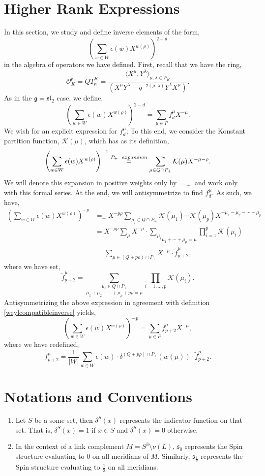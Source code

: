 \documentclass{article}
\def\be{\begin{equation}}
\def\ee{\end{equation}}
\numberwithin{corollary}{theorem}
\numberwithin{corollary}{proposition}
\begin{document}
\section{Higher Rank Expressions}
In this section, we study and define inverse elements of the form,
$$\left(\sum_{w\in W}\epsilon(w)X^{w(\rho)} \right)^{2-d}$$
in the algebra of operators we have defined. First, recall that we have the ring, 
$$\mathcal{O}^\mathfrak{g}_{K} = QT^{K}_\mathfrak{g} = \frac{\langle X^\mu ,Y^\lambda\rangle_{\mu,\lambda\in P_K}}{(X^\mu Y^\lambda - q^{-2(\mu,\lambda)} Y^\lambda X^\mu)}.$$
As in the $\mathfrak{g} = \mathfrak{sl}_2$ case, we define, 
\be\label{high_rank_f}
\left(\sum_{w\in W}\epsilon(w)X^{w(\rho)} \right)^{2-d}=\sum_{\mu\in P} f^\mu_d X^{-\mu}.
\ee
We wish for an explicit expression for $f^\mu_d$; To this end, we consider the Konstant partition function, $\mathcal{K}(\mu)$, which has as its definition,
$$\left(\sum_{w\in W}\epsilon(w)X^{w(\rho)} \right)^{-1} \overset{P_+ \hspace{2mm }expansion}{=} \sum_{\mu\in Q\cap P_+} \mathcal{K}(\mu) X^{-\mu-\rho}.$$
We will denote this expansion in positive weights only by $=_+$ and work only with this formal series. At the end, we will antisymmetrize to find $f^\mu_d$. As such, we have, 
\begin{align*}
\left(\sum_{w\in W}\epsilon(w)X^{w(\rho)} \right)^{-p} & =_+X^{-p \rho}\sum_{\mu_i \in Q \cap P_+} \mathcal{K}(\mu_1)\cdots\mathcal{K}(\mu_p) X^{-\mu_1-\mu_2-\cdots-\mu_p}  \\
& = X^{-\rho p}\sum_\mu X^{-\mu}\cdot \underset{\mu_1+\cdots+\mu_p =\mu}{\sum_{\mu_i}}\prod^p_{i=1}\mathcal{K}(\mu_i)\\
&=\sum_{\mu \in (Q+p\rho)\cap P_+}X^{-\mu} \cdot \tilde{f}^\mu_{p+2},
\end{align*}
where we have set, 
$$\tilde{f}^\mu_{p+2} = \underset{\mu_1+\mu_2+\cdots+\mu_p+p \rho=\mu }{\sum_{\mu_i \in Q\cap P_+}} \prod_{i=1,\ldots,p}\mathcal{K}(\mu_i).$$
Antisymmetrizing the above expression in agreement with definition \ref{weylcompatibleinverse}  yields,
$$\left(\sum_{w\in W}\epsilon(w)X^{w(\rho)} \right)^{-p}=\sum_{\mu \in P} f^{\mu}_{p+2} X^{-\mu},$$
where we have redefined, 
$$\boxed{f^\mu_{p+2} = \frac{1}{|W|}\sum_{w\in W} \epsilon(w)\cdot \delta^{(Q+p\rho )\cap P_+}(w(\mu)) \cdot \tilde{f}^{\mu}_{p+2} .}$$

\section{Notations and Conventions}\label{notationsandconventions}
\begin{enumerate}
    \item Let $S$ be a some set, then $\delta^S(x)$ represents the indicator function on that set. That is, $\delta^S(x)=1$ if $x\in S$ and $\delta^S(x)=0$ otherwise. 
    \item In the context of a link complement $M = S^3 \setminus\nu(L)$, $\mathfrak{s}_0$ represents the $\mathrm{Spin}$ structure evaluating to 0 on all meridians of $M$. Similarly, $\mathfrak{s}_{\frac{1}{2}}$ represents the Spin structure evaluating to $\frac{1}{2}$ on all meridians. 
\end{enumerate}
\end{document}
